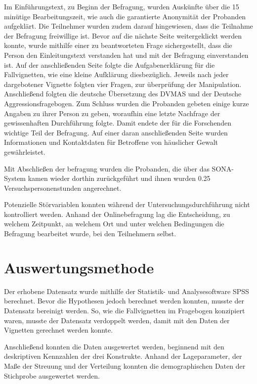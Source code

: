 Im Einführungstext, zu Beginn der Befragung, wurden Auskünfte über die 15 minütige Bearbeitungszeit, wie auch die garantierte Anonymität der Probanden aufgeklärt. Die Teilnehmer wurden zudem darauf hingewiesen, dass die Teilnahme der Befragung freiwillige ist. Bevor auf die nächste Seite weitergeklickt werden konnte, wurde mithilfe einer zu beantworteten Frage sichergestellt, dass die Person den Einleitungstext verstanden hat und mit der Befragung einverstanden ist. Auf der anschließenden Seite folgte die Aufgabenerklärung für die Fallvignetten, wie eine kleine Aufklärung diesbezüglich. Jeweils nach jeder dargebotener Vignette folgten vier Fragen, zur überprüfung der Manipulation. Anschließend folgten die deutsche Übersetzung des DVMAS und der Deutsche Aggressionsfragebogen. Zum Schluss wurden die Probanden gebeten einige kurze Angaben zu ihrer Person zu geben, woraufhin eine letzte Nachfrage der gewissenhaften Durchführung folgte. Damit endete der für die Forschenden wichtige Teil der Befragung. Auf einer daran anschließenden Seite wurden Informationen und Kontaktdaten für Betroffene von häuslicher Gewalt gewährleistet. 

Mit Abschließen der befragung wurden die Probanden, die über das SONA-System kamen wieder dorthin zurückgeführt und ihnen wurden 0.25 Versuchspersonenstunden angerechnet.

Potenzielle Störvariablen konnten während der Untersuchungsdurchführung nicht kontrolliert werden. Anhand der Onlinebefragung lag die Entscheidung, zu welchem Zeitpunkt, an welchem Ort und unter welchen Bedingungen die Befragung bearbeitet wurde, bei den Teilnehmern selbst.


\section{Auswertungsmethode}    \label{sec_3.5}
Der erhobene Datensatz wurde mithilfe der Statistik- und Analysesoftware SPSS berechnet. Bevor die Hypothesen jedoch berechnet werden konnten, musste der Datensatz bereinigt werden. So, wie die Fallvignetten im Fragebogen konzipiert waren, musste der Datensatz verdoppelt werden, damit mit den Daten der Vignetten gerechnet werden konnte. 

Anschließend konnten die Daten ausgewertet werden, beginnend mit den deskriptiven Kennzahlen der drei Konstrukte. Anhand der Lageparameter, der Maße der Streuung und der Verteilung konnten die demographischen Daten der Stichprobe ausgewertet werden.

